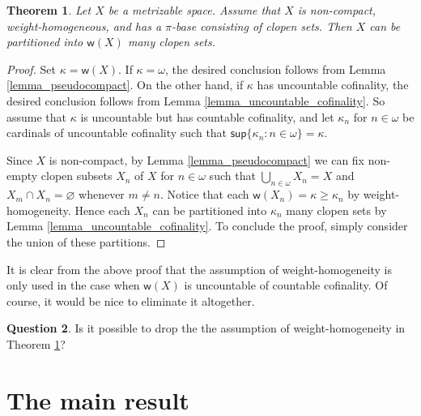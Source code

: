 \documentclass{amsart}
\theoremstyle{plain}
\newtheorem{theorem}{Theorem}[section]
\theoremstyle{definition}
\newtheorem{question}[theorem]{Question}
\newcommand{\weight}{\mathsf{w}}
\newcommand{\supi}{\mathsf{sup}}
\begin{document}
\begin{theorem}\label{theorem_partition}
Let $X$ be a metrizable space. Assume that $X$ is non-compact, weight-homogeneous, and has a $\pi$-base consisting of clopen sets. Then $X$ can be partitioned into $\weight(X)$ many clopen sets.
\end{theorem}
\begin{proof}
Set $\kappa=\weight(X)$. If $\kappa=\omega$, the desired conclusion follows from Lemma \ref{lemma_pseudocompact}. On the other hand, if $\kappa$ has uncountable cofinality, the desired conclusion follows from Lemma \ref{lemma_uncountable_cofinality}. So assume that $\kappa$ is uncountable but has countable cofinality, and let $\kappa_n$ for $n\in\omega$ be cardinals of uncountable cofinality such that $\supi\{\kappa_n:n\in\omega\}=\kappa$.

Since $X$ is non-compact, by Lemma \ref{lemma_pseudocompact} we can fix non-empty clopen subsets $X_n$ of $X$ for $n\in\omega$ such that $\bigcup_{n\in\omega}X_n=X$ and $X_m\cap X_n=\varnothing$ whenever $m\neq n$. Notice that each $\weight(X_n)=\kappa\geq\kappa_n$ by weight-homogeneity. Hence each $X_n$ can be partitioned into $\kappa_n$ many clopen sets by Lemma \ref{lemma_uncountable_cofinality}. To conclude the proof, simply consider the union of these partitions.
\end{proof}

It is clear from the above proof that the assumption of weight-homogeneity is only used in the case when $\weight(X)$ is uncountable of countable cofinality. Of course, it would be nice to eliminate it altogether.
\begin{question}
Is it possible to drop the the assumption of weight-homogeneity in Theorem \ref{theorem_partition}?
\end{question}

\section{The main result}
\end{document}

